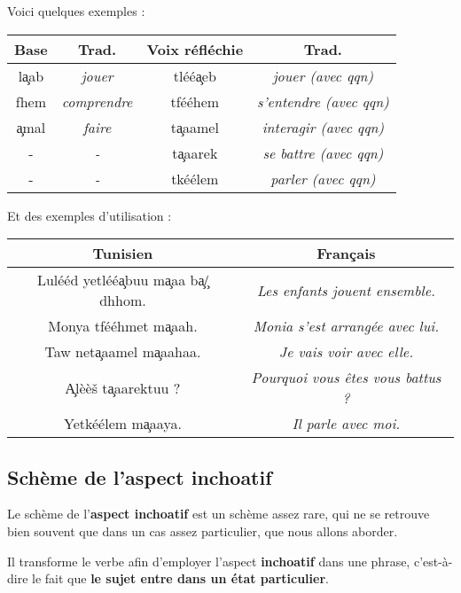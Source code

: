 Voici quelques exemples : 

\begin{center}
\begin{tabular}{||c | c | c | c ||}
 \hline
  \textbf{Base} & \textbf{Trad.} & \textbf{Voix réfléchie} & \textbf{Trad.} \\
 \hline\hline
  l\c{a}ab & \textit{jouer} & tléé\c{a}eb & \textit{jouer (avec qqn)}\\
  \hline
  fhem & \textit{comprendre} & tfééhem & \textit{s'entendre (avec qqn)}\\
  \hline
  \c{a}mal & \textit{faire} & t\c{a}aamel & \textit{interagir (avec qqn)}\\
  \hline
  - & \textit{-} & t\c{a}aarek & \textit{se battre (avec qqn)}\\
  \hline
  - & \textit{-} & tkéélem & \textit{parler (avec qqn)}\\
  \hline
\end{tabular}    
\end{center}

Et des exemples d'utilisation : 

\begin{center}
\begin{tabular}{||c | c ||}
 \hline
 \textbf{Tunisien} & \textbf{Français} \\
 \hline\hline
 Lulééd yetléé\c{a}buu m\c{a}aa b\c{a}\c{/dh}hom. & \textit{Les enfants jouent ensemble.} \\ 
 \hline
 Monya tfééhmet m\c{a}aah. & \textit{Monia s'est arrangée avec lui.} \\ 
 \hline
 Taw net\c{a}aamel m\c{a}aahaa. & \textit{Je vais voir avec elle.} \\ 
 \hline
 \c{A}lèè\v{s} t\c{a}aarektuu ? & \textit{Pourquoi vous êtes vous battus ?} \\ 
 \hline
 Yetkéélem m\c{a}aaya. & \textit{Il parle avec moi.} \\ 
 \hline
\end{tabular}
\end{center}

\subsection{Schème de l'aspect inchoatif}
Le schème de l'\textbf{aspect inchoatif} est un schème assez rare, qui ne se retrouve bien souvent que dans un cas assez particulier, que nous allons aborder.

Il transforme le verbe afin d'employer l'aspect \textbf{inchoatif} dans une phrase, c'est-à-dire le fait que \textbf{le sujet entre dans un état particulier}. 

